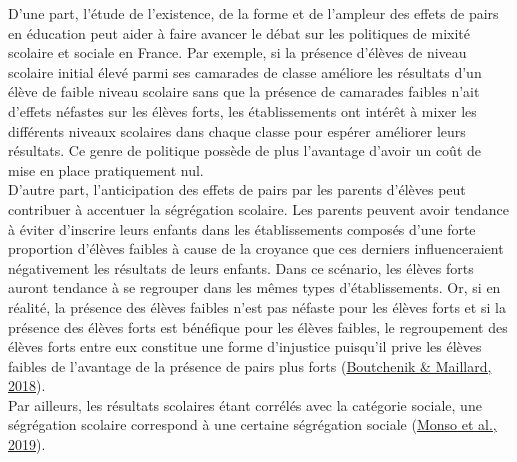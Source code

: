 \documentclass[
]{book}
\begin{document}
\quad D'une part, l'étude de l'existence, de la forme et de l'ampleur des effets de pairs en éducation peut aider à faire avancer le débat sur les politiques de mixité scolaire et sociale en France. Par exemple, si la présence d'élèves de niveau scolaire initial élevé parmi ses camarades de classe améliore les résultats d'un élève de faible niveau scolaire sans que la présence de camarades faibles n'ait d'effets néfastes sur les élèves forts, les établissements ont intérêt à mixer les différents niveaux scolaires dans chaque classe pour espérer améliorer leurs résultats. Ce genre de politique possède de plus l'avantage d'avoir un coût de mise en place pratiquement nul.\\
D'autre part, l'anticipation des effets de pairs par les parents d'élèves peut contribuer à accentuer la ségrégation scolaire. Les parents peuvent avoir tendance à éviter d'inscrire leurs enfants dans les établissements composés d'une forte proportion d'élèves faibles à cause de la croyance que ces derniers influenceraient négativement les résultats de leurs enfants. Dans ce scénario, les élèves forts auront tendance à se regrouper dans les mêmes types d'établissements. Or, si en réalité, la présence des élèves faibles n'est pas néfaste pour les élèves forts et si la présence des élèves forts est bénéfique pour les élèves faibles, le regroupement des élèves forts entre eux constitue une forme d'injustice puisqu'il prive les élèves faibles de l'avantage de la présence de pairs plus forts (\protect\hyperlink{ref-BOU:MAI:18}{Boutchenik \& Maillard, 2018}).\\
Par ailleurs, les résultats scolaires étant corrélés avec la catégorie sociale, une ségrégation scolaire correspond à une certaine ségrégation sociale (\protect\hyperlink{ref-MON:eal:19}{Monso et al., 2019}).
\end{document}
